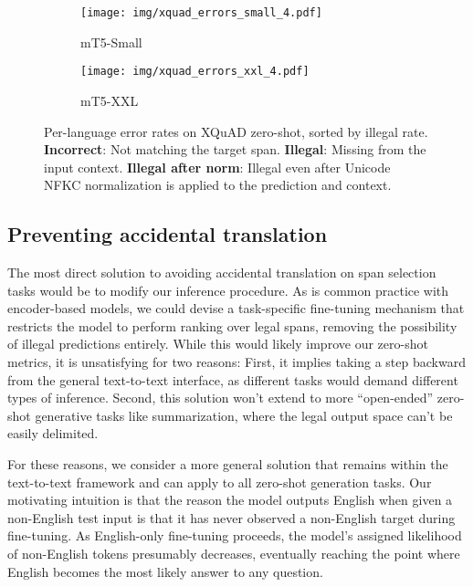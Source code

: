 \documentclass[11pt]{article}
\begin{document}
\begin{figure}
    \begin{subfigure}[b]{\columnwidth}
    \centering
    \texttt{[image: img/xquad\_errors\_small\_4.pdf]}
    \caption{mT5-Small}
    \label{fig:xquad_errors_small}
    \end{subfigure}
    
    \vspace{4pt}
    
    \begin{subfigure}[b]{\columnwidth}
    \texttt{[image: img/xquad\_errors\_xxl\_4.pdf]}
    \caption{mT5-XXL}
    \label{fig:xquad_errors_xxl}
    \end{subfigure}
    \caption{Per-language error rates on XQuAD zero-shot, sorted by illegal rate. \textbf{Incorrect}: Not matching the target span. \textbf{Illegal}: Missing from the input context. \textbf{Illegal after norm}: Illegal even after Unicode NFKC normalization is applied to the prediction and context.}
    \label{fig:xquad_errors}
\end{figure}

\subsection{Preventing accidental translation}
















The most direct solution to avoiding accidental translation on span selection tasks would be to modify our inference procedure.
As is common practice with encoder-based models, we could devise a task-specific fine-tuning mechanism that restricts the model to perform ranking over legal spans, removing the possibility of illegal predictions entirely.
While this would likely improve our zero-shot metrics, it is unsatisfying for two reasons:
First, it implies taking a step backward from the general text-to-text interface, as different tasks would demand different types of inference.
Second, this solution won't extend to more ``open-ended'' zero-shot generative tasks like summarization, where the legal output space can't be easily delimited. 



For these reasons, we consider a more general solution that remains within the text-to-text framework and can apply to all zero-shot generation tasks.
Our motivating intuition is that the reason the model outputs English when given a non-English test input is that it has never observed a non-English target during fine-tuning.
As English-only fine-tuning proceeds, the model's assigned likelihood of non-English tokens presumably decreases, eventually reaching the point where English becomes the most likely answer to any question.
\end{document}
